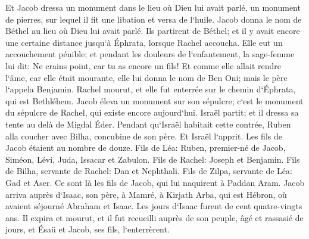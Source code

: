 \verse Et Jacob dressa un monument dans le lieu où Dieu lui avait parlé, un monument de pierres, sur lequel il fit une libation et versa de l`huile. 
\verse Jacob donna le nom de Béthel au lieu où Dieu lui avait parlé. 
\verse Ils partirent de Béthel; et il y avait encore une certaine distance jusqu`à Éphrata, lorsque Rachel accoucha. Elle eut un accouchement pénible; 
\verse et pendant les douleurs de l`enfantement, la sage-femme lui dit: Ne crains point, car tu as encore un fils! 
\verse Et comme elle allait rendre l`âme, car elle était mourante, elle lui donna le nom de Ben Oni; mais le père l`appela Benjamin. 
\verse Rachel mourut, et elle fut enterrée sur le chemin d`Éphrata, qui est Bethléhem. 
\verse Jacob éleva un monument sur son sépulcre; c`est le monument du sépulcre de Rachel, qui existe encore aujourd`hui. 
\verse Israël partit; et il dressa sa tente au delà de Migdal Éder. 
\verse Pendant qu`Israël habitait cette contrée, Ruben alla coucher avec Bilha, concubine de son père. Et Israël l`apprit. Les fils de Jacob étaient au nombre de douze. 
\verse Fils de Léa: Ruben, premier-né de Jacob, Siméon, Lévi, Juda, Issacar et Zabulon. 
\verse Fils de Rachel: Joseph et Benjamin. 
\verse Fils de Bilha, servante de Rachel: Dan et Nephthali. 
\verse Fils de Zilpa, servante de Léa: Gad et Aser. Ce sont là les fils de Jacob, qui lui naquirent à Paddan Aram. 
\verse Jacob arriva auprès d`Isaac, son père, à Mamré, à Kirjath Arba, qui est Hébron, où avaient séjourné Abraham et Isaac. 
\verse Les jours d`Isaac furent de cent quatre-vingts ans. 
\verse Il expira et mourut, et il fut recueilli auprès de son peuple, âgé et rassasié de jours, et Ésaü et Jacob, ses fils, l`enterrèrent. 

